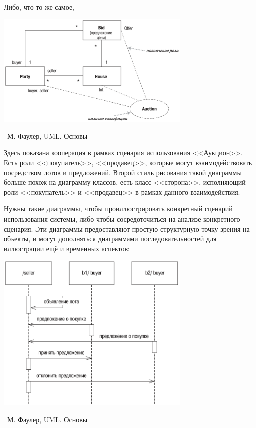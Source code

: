 \documentclass[a5paper]{article}
\newcommand{\attribution}[1] {
    \vspace{-5mm}\begin{flushright}\begin{scriptsize}%
    {\textcopyright\, #1}\end{scriptsize}\end{flushright}
}
\begin{document}
Либо, что то же самое,

\begin{center}
    \includegraphics[width=0.7\textwidth]{cooperationAlternateNotation.png}
    \attribution{М. Фаулер, UML. Основы}
\end{center}

Здесь показана кооперация в рамках сценария использования <<Аукцион>>. Есть роли <<покупатель>>, <<продавец>>, которые могут взаимодействовать посредством лотов и предложений. Второй стиль рисования такой диаграммы больше похож на диаграмму классов, есть класс <<сторона>>, исполняющий роли <<покупатель>> и <<продавец>> в рамках данного взаимодействия.

Нужны такие диаграммы, чтобы проиллюстрировать конкретный сценарий использования системы, либо чтобы сосредоточиться на анализе конкретного сценария. Эти диаграммы предоставляют простую структурную точку зрения на объекты, и могут дополняться диаграммами последовательностей для иллюстрации ещё и временных аспектов:

\begin{center}
    \includegraphics[width=0.7\textwidth]{cooperationSequenceDiagram.png}
    \attribution{М. Фаулер, UML. Основы}
\end{center}
\end{document}
